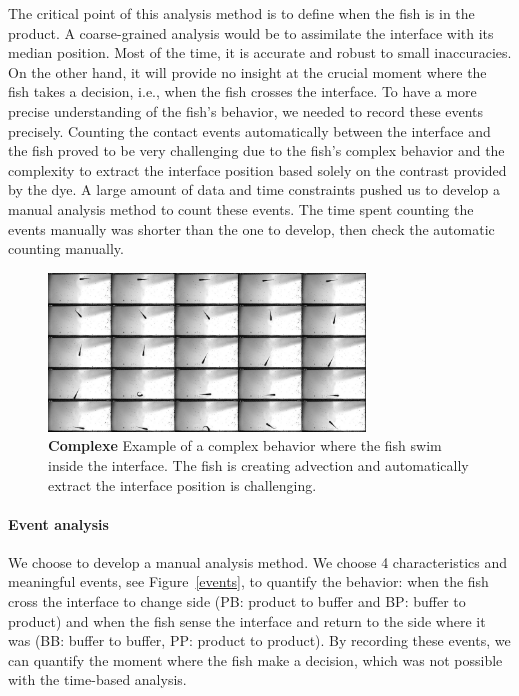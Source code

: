   The critical point of this analysis method is to define when the fish is in the product. A coarse-grained analysis would be to assimilate the interface with its median position. Most of the time, it is accurate and robust to small inaccuracies. On the other hand, it will provide no insight at the crucial moment where the fish takes a decision, i.e., when the fish crosses the interface. To have a more precise understanding of the fish's behavior, we needed to record these events precisely. Counting the contact events automatically between the interface and the fish proved to be very challenging due to the fish's complex behavior and the complexity to extract the interface position based solely on the contrast provided by the dye. A large amount of data and time constraints pushed us to develop a manual analysis method to count these events. The time spent counting the events manually was shorter than the one to develop, then check the automatic counting manually.

    \begin{figure}[h]
      \centering
      \includegraphics[width=0.75\textwidth]{part_2/assets/behavior.jpg}
      \caption{\textbf{Complexe} Example of a complex behavior where the fish swim inside the interface. The fish is creating advection and automatically extract the interface position is challenging.}
      \label{behavior_comp}
    \end{figure}

  \paragraph{Event analysis} We choose to develop a manual analysis method. We choose 4 characteristics and meaningful events, see Figure~\ref{events}, to quantify the behavior: when the fish cross the interface to change side (PB: product to buffer and BP: buffer to product) and when the fish sense the interface and return to the side where it was (BB: buffer to buffer, PP: product to product). By recording these events, we can quantify the moment where the fish make a decision, which was not possible with the time-based analysis.

